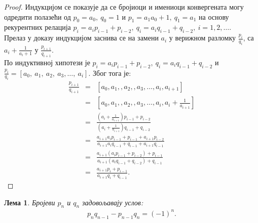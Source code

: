 \documentclass[a4paper]{article}
\newtheorem{lemma}{Лема}
\begin{document}
\begin{proof}	
	Индукцијом се показује да се бројиоци и имениоци конвергената могу одредити полазећи од $ p_{0} = a_{0},\  q_{0} = 1 $ и $ p_{1} = a_{1}a_{0} + 1,\ q_{1} = a_{1} $ на основу рекурентних релација $ p_{i} = a_{i}p_{i-1} + p_{i-2},\ q_{i} = a_{i}q_{i-1} + q_{i-2},\ i = 1, 2, \ldots $.\\
	Прелаз у доказу индукцијом заснива се на замени $ a_{i} $ у верижном разломку $ \frac{p_{i}}{q_{i}} $, са $ a_{i} + \frac{1}{a_{i} + 1} $
	у $ \frac{p_{i+1}}{q_{i+1}} $.\\
	По индуктивној хипотези је $ p_{i} = a_{i}p_{i-1} + p_{i-2},\ q_{i} = a_{i}q_{i-1} + q_{i-2} $ и $ \frac{p_{i}}{q_{i}} = [a_{0},\ a_{1},\ a_{2},\  a_{3}, \ldots,\ a_{i}] $. Због тога је:	
	\begin{eqnarray*}
		\frac{p_{i+1}}{q_{i+1}} &=& [a_{0}, a_{1}, , a_{2}, , a_{3}, \ldots, a_{i}, a_{i+1}]\\
		&=& [a_{0}, a_{1}, , a_{2}, , a_{3}, \ldots, a_{i}, a_{i} + \frac{1}{a_{i+1}}] \\
		&=& \frac{(a_{i} + \frac{1}{a_{i+1}})p_{i-1} + p_{i-2}}{(a_{i} + \frac{1}{a_{i+1}})q_{i-1} + q_{i-2}} \\
		&=& \frac{a_{i+1}a_{i}p_{i-1} + p_{i-1} + a_{i+1}p_{i-2}}{a_{i+1}a_{i}q_{i-1} + q_{i-1} + a_{i+1}q_{i-1}}\\
		&=& \frac{a_{i+1}(a_{i}p_{i-1} + p_{i-2}) + p_{i-1}}{a_{i+1}(a_{i}q_{i-1} + q_{i-2}) + q_{i-1}}\\
		&=& \frac{a_{i+1}p_{i} + p_{i-1}}{a_{i+1}q_{i} + q_{i-1}}. 
	\end{eqnarray*}
\end{proof}

\begin{lemma}
	\label{lemma:svojstva_p_q_1}
	Бројеви $ p_{n} $ и $ q_{n} $ задовољавају услов:	
	\begin{eqnarray}
		\label{c.f_svojstvo_1} p_{n}q_{n-1} - p_{n-1}q_{n} = (-1)^{n}.
	\end{eqnarray}	
\end{lemma}
\end{document}

